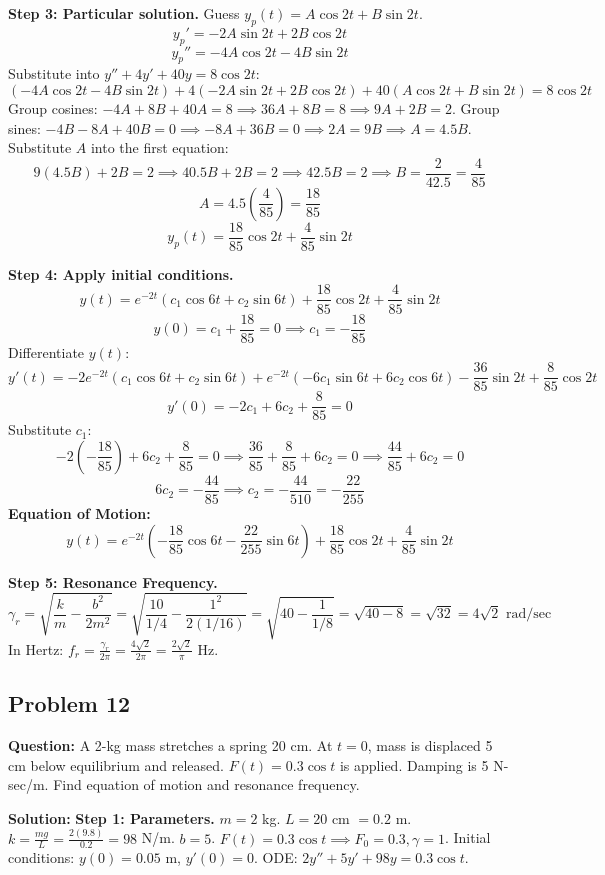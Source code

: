 \documentclass[11pt]{article}
\begin{document}
\textbf{Step 3: Particular solution.}
Guess $y_p(t) = A \cos 2t + B \sin 2t$.
\[ y_p' = -2A \sin 2t + 2B \cos 2t \]
\[ y_p'' = -4A \cos 2t - 4B \sin 2t \]
Substitute into $y'' + 4y' + 40y = 8 \cos 2t$:
\[ (-4A \cos 2t - 4B \sin 2t) + 4(-2A \sin 2t + 2B \cos 2t) + 40(A \cos 2t + B \sin 2t) = 8 \cos 2t \]
Group cosines: $-4A + 8B + 40A = 8 \implies 36A + 8B = 8 \implies 9A + 2B = 2$.
Group sines: $-4B - 8A + 40B = 0 \implies -8A + 36B = 0 \implies 2A = 9B \implies A = 4.5B$.
Substitute $A$ into the first equation:
\[ 9(4.5B) + 2B = 2 \implies 40.5B + 2B = 2 \implies 42.5B = 2 \implies B = \frac{2}{42.5} = \frac{4}{85} \]
\[ A = 4.5 \left(\frac{4}{85}\right) = \frac{18}{85} \]
\[ y_p(t) = \frac{18}{85} \cos 2t + \frac{4}{85} \sin 2t \]

\textbf{Step 4: Apply initial conditions.}
\[ y(t) = e^{-2t}(c_1 \cos 6t + c_2 \sin 6t) + \frac{18}{85} \cos 2t + \frac{4}{85} \sin 2t \]
\[ y(0) = c_1 + \frac{18}{85} = 0 \implies c_1 = -\frac{18}{85} \]
Differentiate $y(t)$:
\[ y'(t) = -2e^{-2t}(c_1 \cos 6t + c_2 \sin 6t) + e^{-2t}(-6c_1 \sin 6t + 6c_2 \cos 6t) - \frac{36}{85} \sin 2t + \frac{8}{85} \cos 2t \]
\[ y'(0) = -2c_1 + 6c_2 + \frac{8}{85} = 0 \]
Substitute $c_1$:
\[ -2\left(-\frac{18}{85}\right) + 6c_2 + \frac{8}{85} = 0 \implies \frac{36}{85} + \frac{8}{85} + 6c_2 = 0 \implies \frac{44}{85} + 6c_2 = 0 \]
\[ 6c_2 = -\frac{44}{85} \implies c_2 = -\frac{44}{510} = -\frac{22}{255} \]
\textbf{Equation of Motion:}
\[ y(t) = e^{-2t}\left(-\frac{18}{85} \cos 6t - \frac{22}{255} \sin 6t\right) + \frac{18}{85} \cos 2t + \frac{4}{85} \sin 2t \]

\textbf{Step 5: Resonance Frequency.}
\[ \gamma_r = \sqrt{\frac{k}{m} - \frac{b^2}{2m^2}} = \sqrt{\frac{10}{1/4} - \frac{1^2}{2(1/16)}} = \sqrt{40 - \frac{1}{1/8}} = \sqrt{40 - 8} = \sqrt{32} = 4\sqrt{2} \text{ rad/sec} \]
In Hertz: $f_r = \frac{\gamma_r}{2\pi} = \frac{4\sqrt{2}}{2\pi} = \frac{2\sqrt{2}}{\pi}$ Hz.

\subsection{Problem 12}
\textbf{Question:} A 2-kg mass stretches a spring 20 cm. At $t=0$, mass is displaced 5 cm below equilibrium and released. $F(t) = 0.3 \cos t$ is applied. Damping is 5 N-sec/m. Find equation of motion and resonance frequency.

\textbf{Solution:}
\textbf{Step 1: Parameters.}
$m = 2$ kg.
$L = 20$ cm $= 0.2$ m. $k = \frac{mg}{L} = \frac{2(9.8)}{0.2} = 98$ N/m.
$b = 5$.
$F(t) = 0.3 \cos t \implies F_0 = 0.3, \gamma = 1$.
Initial conditions: $y(0) = 0.05$ m, $y'(0) = 0$.
ODE: $2y'' + 5y' + 98y = 0.3 \cos t$.
\end{document}
